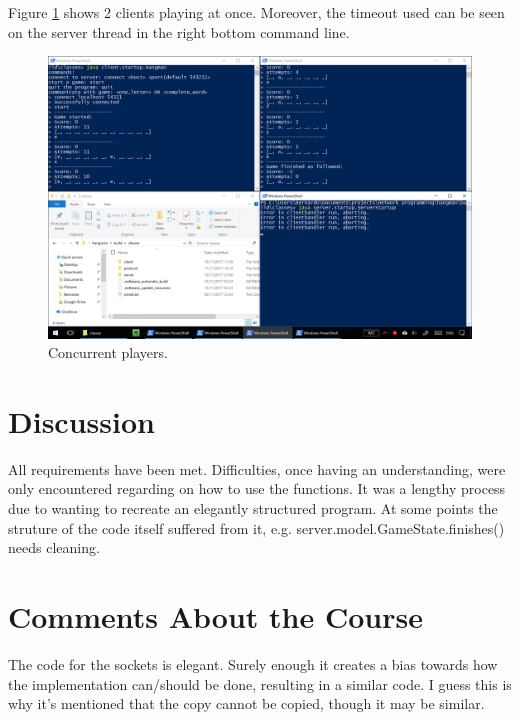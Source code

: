 \documentclass[a4paper]{scrartcl}
\begin{document}
Figure \ref{fig:multiple} shows 2 clients playing at once. Moreover, the timeout used can be seen on the server thread in the right bottom command line.

\begin{figure}[h!]
  \begin{center}
    \includegraphics[scale=0.4]{multiple.png}
    \caption{Concurrent players.}
    \label{fig:multiple}
  \end{center}
\end{figure}

\section{Discussion}

All requirements have been met.
Difficulties, once having an understanding, were only encountered regarding on how to use the functions.
It was a lengthy process due to wanting to recreate an elegantly structured program.
At some points the struture of the code itself suffered from it, e.g. server.model.GameState.finishes() needs cleaning.



\section{Comments About the Course}

The code for the sockets is elegant.
Surely enough it creates a bias towards how the implementation can/should be done, resulting in a similar code.
I guess this is why it's mentioned that the copy cannot be copied, though it may be similar.
\end{document}
